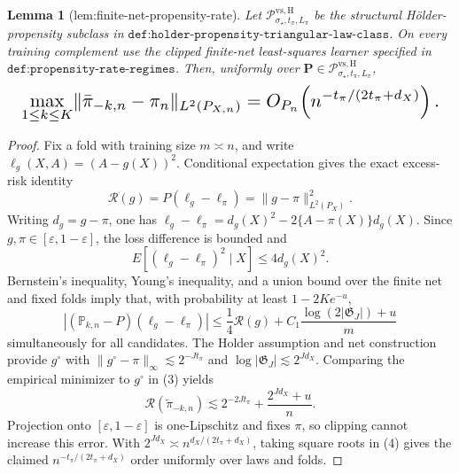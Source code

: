 \documentclass{article}
\newtheorem{lemma}{Lemma}
\begin{document}
\begin{lemma}[lem:finite-net-propensity-rate]\label{lem:finite-net-propensity-rate}
Let \(\mathscr P^{\mathrm{vs,H}}_{\sigma_\star,t_\pi,L_\pi}\) be the structural H\"older-propensity subclass in \(\texttt{def:holder-propensity-triangular-law-class}\).  On every training complement use the clipped finite-net least-squares learner specified in \(\texttt{def:propensity-rate-regimes}\).  Then, uniformly over \(\mathbf P\in\mathscr P^{\mathrm{vs,H}}_{\sigma_\star,t_\pi,L_\pi}\),
\[
\makebox[\linewidth][c]{\resizebox{0.98\linewidth}{!}{\(\displaystyle \max_{1\le k\le K}\lVert\bar\pi_{-k,n}-\pi_n\rVert_{L^2(P_{X,n})}
=O_{P_n}\!\left(n^{-t_\pi/(2t_\pi+d_X)}\right).\)}}
\]
\end{lemma}
\begin{proof}
Fix a fold with training size \(m\asymp n\), and write \(\ell_g(X,A)=(A-g(X))^2\). Conditional expectation gives the exact excess-risk identity
\[\mathcal R(g)=P(\ell_g-\ell_\pi)=\lVert g-\pi\rVert_{L^2(P_X)}^2.\tag{1}\]
Writing \(d_g=g-\pi\), one has \(\ell_g-\ell_\pi=d_g(X)^2-2\{A-\pi(X)\}d_g(X)\). Since \(g,\pi\in[\varepsilon,1-\varepsilon]\), the loss difference is bounded and
\[E[(\ell_g-\ell_\pi)^2\mid X]\le4d_g(X)^2.\tag{2}\]
Bernstein's inequality, Young's inequality, and a union bound over the finite net and fixed folds imply that, with probability at least \(1-2Ke^{-u}\),
\[|({\mathbb P}_{k,n}-P)(\ell_g-\ell_\pi)|\le\frac14\mathcal R(g)+C_1\frac{\log(2|\mathfrak G_J|)+u}{m}\tag{3}\]
simultaneously for all candidates. The Holder assumption and net construction provide \(g^\circ\) with \(\lVert g^\circ-\pi\rVert_\infty\lesssim2^{-Jt_\pi}\) and \(\log|\mathfrak G_J|\lesssim2^{Jd_X}\). Comparing the empirical minimizer to \(g^\circ\) in (3) yields
\[\mathcal R(\widetilde\pi_{-k,n})\lesssim2^{-2Jt_\pi}+\frac{2^{Jd_X}+u}{n}.\tag{4}\]
Projection onto \([\varepsilon,1-\varepsilon]\) is one-Lipschitz and fixes \(\pi\), so clipping cannot increase this error. With \(2^{Jd_X}\asymp n^{d_X/(2t_\pi+d_X)}\), taking square roots in (4) gives the claimed \(n^{-t_\pi/(2t_\pi+d_X)}\) order uniformly over laws and folds.
\end{proof}
\end{document}
